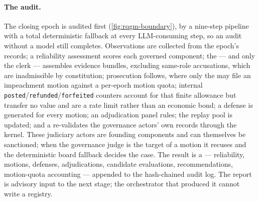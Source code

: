 \paragraph{The audit.}
The closing epoch is audited first (\cref{fig:rqgm-boundary}), by a
nine-step pipeline with a total deterministic fallback at every
LLM-consuming step, so an audit without a model still completes.
Observations are collected from the epoch's records; a reliability
assessment scores each governed component; the 
--- and only the clerk --- assembles evidence bundles, excluding
same-role accusations, which are inadmissible by constitution;
prosecution follows, where only the  may file an
impeachment motion against a per-epoch motion quota; internal
\texttt{posted}/\texttt{refunded}/\texttt{forfeited} counters account for
that finite allowance but transfer no value and are a rate limit rather
than an economic bond; a defense is generated for every motion; an
adjudication panel rules; the replay pool is updated; and a
 re-validates the governance actors' own
records through the kernel. These judiciary actors are founding
components and can themselves be sanctioned; when the governance judge
is the target of a motion it recuses and the deterministic board fallback
decides the case. The result is a 
--- reliability, motions, defenses, adjudications, candidate
evaluations, recommendations, motion-quota accounting --- appended to the
hash-chained audit log. The report is advisory input to the next
stage; the orchestrator that produced it cannot write a registry.

